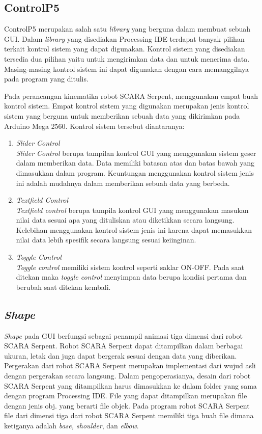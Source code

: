 \subsection{ControlP5}
ControlP5 merupakan salah satu \textit{library} yang berguna dalam membuat sebuah GUI. Dalam \textit{library} yang disediakan Processing IDE terdapat banyak pilihan terkait kontrol sistem yang dapat digunakan. Kontrol sistem yang disediakan tersedia dua pilihan yaitu untuk mengirimkan data dan untuk menerima data. Masing-masing kontrol sistem ini dapat digunakan dengan cara memanggilnya pada program yang ditulis.

Pada perancangan kinematika robot SCARA Serpent, menggunakan empat buah kontrol sistem. Empat kontrol sistem yang digunakan merupakan jenis kontrol sistem yang berguna untuk memberikan sebuah data yang dikirimkan pada Arduino Mega 2560. Kontrol sistem tersebut diantaranya:
\begin{enumerate}
	\item \textit{Slider Control} \\
	\textit{Slider Control} berupa tampilan kontrol GUI yang menggunakan sistem geser dalam memberikan data. Data memiliki batasan atas dan batas bawah yang dimasukkan dalam program. Keuntungan menggunakan kontrol sistem jenis ini adalah mudahnya dalam memberikan sebuah data yang berbeda.
	
	
	\item \textit{Textfield Control} \\
	\textit{Textfield control} berupa tampila kontrol GUI yang menggunakan masukan nilai data sesuai apa yang dituliskan atau diketikkan secara langsung. Kelebihan menggunakan kontrol sistem jenis ini karena dapat memasukkan nilai data lebih spesifik secara langsung sesuai keiinginan.
	
	
	\item \textit{Toggle Control} \\
	\textit{Toggle control} memiliki sistem kontrol seperti saklar ON-OFF. Pada saat ditekan maka \textit{toggle control} menyimpan data berupa kondisi pertama dan berubah saat ditekan kembali. 
	
\end{enumerate}
\subsection{\textit{Shape}}
\textit{Shape} pada GUI berfungsi sebagai penampil animasi tiga dimensi dari robot SCARA Serpent. Robot SCARA Serpent dapat ditampilkan dalam berbagai ukuran, letak dan juga dapat bergerak sesuai dengan data yang diberikan. Pergerakan dari robot SCARA Serpent merupakan implementasi dari wujud asli dengan pergerakan secara langsung. Dalam pengoperasianya, desain dari robot SCARA Serpent yang ditampilkan harus dimasukkan ke dalam folder yang sama dengan program Processing IDE. File yang dapat ditampilkan merupakan file dengan jenis obj. yang berarti file objek. Pada program robot SCARA Serpent file dari dimensi tiga dari robot SCARA Serpent memiliki tiga buah file dimana ketiganya adalah \textit{base, shoulder}, dan \textit{elbow}. 

